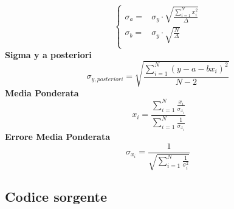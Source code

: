 \documentclass[a4paper,11pt,oneside]{article}
\begin{document}
\begin{equation*}
    \begin{cases}
    \sigma_{a}=&\sigma_{y}\cdot\sqrt{\frac{\sum_{i=1}^{N}{x_{i}^{2}}}{\Delta}} \\
    \sigma_{b}=&\sigma_y\cdot \sqrt{\frac{N}{\Delta }}\\
    \end{cases}
\end{equation*}
\textbf{Sigma y a posteriori}
\begin{equation*}
    \sigma_{y, posteriori}=\sqrt{\frac{\sum_{i=1}^{N}(y-a-bx_{i})^{2}}{N-2}}\label{eq:y_posteriori}
\end{equation*}
\textbf{Media Ponderata}
\begin{equation*}\
    x_i=\frac{\sum_{i=1}^{N}\frac{x_i}{\sigma_{x_i}}}{\sum_{i=1}^{N}\frac{1}{\sigma_{x_i}}} \label{eq:media_ponderata}
\end{equation*}
\textbf{Errore Media Ponderata}
\begin{equation*}
     \sigma_{x_i}=\frac{1}{\sqrt{\sum_{i=1}^{N}\frac{1}{\sigma_{i}^{2}}}}\label{eq:errore_media_pond}
\end{equation*}
\subsection{Codice sorgente}
\end{document}
